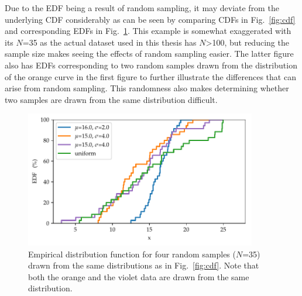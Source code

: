 \documentclass[english, twoside]{HYgradu}
\begin{document}
Due to the EDF being a result of random sampling, it may deviate from the underlying CDF considerably as can be seen by comparing CDFs in Fig.\ \ref{fig:cdf} and corresponding EDFs in Fig.\ \ref{fig:edf}. This example is somewhat exaggerated with its $N$=35 as the actual dataset used in this thesis has $N$>100, but reducing the sample size makes seeing the effects of random sampling easier. The latter figure also has EDFs corresponding to two random samples drawn from the distribution of the orange curve in the first figure to further illustrate the differences that can arise from random sampling. This randomness also makes determining whether two samples are drawn from the same distribution difficult.

\begin{figure}
   \centering
   \includegraphics[width=0.9\textwidth]{kuvat/edf.pdf}
   \caption{Empirical distribution function for four random samples ($N$=35) drawn from the same distributions as in Fig.\ \ref{fig:cdf}. Note that both the orange and the violet data are drawn from the same distribution.}
   \label{fig:edf}
\end{figure}
\end{document}
